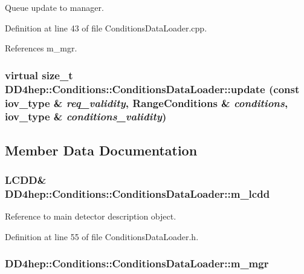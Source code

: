 Queue update to manager. 

Definition at line 43 of file ConditionsDataLoader.cpp.

References m\_\-mgr.\hypertarget{class_d_d4hep_1_1_conditions_1_1_conditions_data_loader_a927c3e60a4ea2873d97433900783ffc1}{
\subsubsection[{update}]{\setlength{\rightskip}{0pt plus 5cm}virtual size\_\-t DD4hep::Conditions::ConditionsDataLoader::update (const {\bf iov\_\-type} \& {\em req\_\-validity}, \/  {\bf RangeConditions} \& {\em conditions}, \/  {\bf iov\_\-type} \& {\em conditions\_\-validity})}}
\label{class_d_d4hep_1_1_conditions_1_1_conditions_data_loader_a927c3e60a4ea2873d97433900783ffc1}


\subsection{Member Data Documentation}
\hypertarget{class_d_d4hep_1_1_conditions_1_1_conditions_data_loader_a6920143ee0788f253031a3d0a25e2d0f}{
\subsubsection[{m\_\-lcdd}]{\setlength{\rightskip}{0pt plus 5cm}LCDD\& {\bf DD4hep::Conditions::ConditionsDataLoader::m\_\-lcdd}}}
\label{class_d_d4hep_1_1_conditions_1_1_conditions_data_loader_a6920143ee0788f253031a3d0a25e2d0f}


Reference to main detector description object. 

Definition at line 55 of file ConditionsDataLoader.h.\hypertarget{class_d_d4hep_1_1_conditions_1_1_conditions_data_loader_a470c95c837745118517cc86bdc668346}{
\subsubsection[{m\_\-mgr}]{ {\bf DD4hep::Conditions::ConditionsDataLoader::m\_\-mgr}}}
\label{class_d_d4hep_1_1_conditions_1_1_conditions_data_loader_a470c95c837745118517cc86bdc668346}


